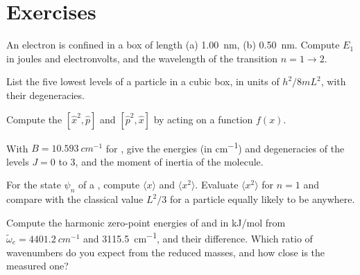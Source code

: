 \section{Exercises}

\begin{exercise}[$\star$]\label{exo:b3:quantum-model-systems:1}
An electron is confined in a box of length (a) \qty{1.00}{nm}, (b)
\qty{0.50}{nm}. Compute $E_1$ in joules and electronvolts, and the wavelength
of the transition $n = 1 \to 2$.
\end{exercise}

\begin{exercise}[$\star$]\label{exo:b3:quantum-model-systems:2}
List the five lowest levels of a particle in a cubic box, in units of
$h^2/8mL^2$, with their degeneracies.
\end{exercise}

\begin{exercise}[$\star$]\label{exo:b3:quantum-model-systems:3}
Compute the  $[\hat x^2,\hat p]$ and $[\hat p^2,\hat x]$ by acting
on a function $f(x)$.
\end{exercise}

\begin{exercise}[$\star$]\label{exo:b3:quantum-model-systems:4}
With $B = \qty{10.593}{cm^{-1}}$ for , give the energies (in
\unit{cm^{-1}}) and degeneracies of the levels $J = 0$ to 3, and the moment of
inertia of the molecule.
\end{exercise}

\begin{exercise}[$\star\star$]\label{exo:b3:quantum-model-systems:5}
For the state $\psi_n$ of a , compute $\langle x\rangle$ and
$\langle x^2\rangle$. Evaluate $\langle x^2\rangle$ for $n = 1$ and compare with
the classical value $L^2/3$ for a particle equally likely to be anywhere.
\end{exercise}

\begin{exercise}[$\star\star$]\label{exo:b3:quantum-model-systems:6}
Compute the harmonic zero-point energies of  and  in
\unit{kJ/mol} from $\tilde\omega_e = \qty{4401.2}{cm^{-1}}$ and
\qty{3115.5}{cm^{-1}}, and their difference. Which ratio of wavenumbers do you
expect from the reduced masses, and how close is the measured one?
\end{exercise}

